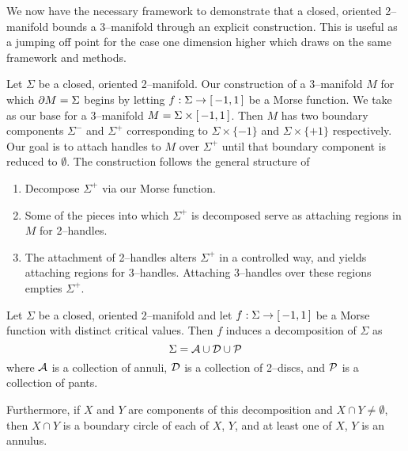\label{sec:2bound3}




We now have the necessary framework to demonstrate that a closed, oriented 2--manifold bounds a 3--manifold through an explicit construction.
This is useful as a jumping off point for the case one dimension higher which draws on the same framework and methods.

Let $\Sigma$ be a closed, oriented 2--manifold.
Our construction of a 3--manifold $M$ for which $\partial M=\Sigma$ begins by letting $f:\Sigma\to[\,-1,1\,]$ be a Morse function.
We take as our base for a 3--manifold $M=\Sigma\times[\,-1,1\,]$.
Then $M$ has two boundary components $\Sigma^-$ and $\Sigma^+$ corresponding to $\Sigma\times\{-1\}$ and $\Sigma\times\{+1\}$ respectively.
Our goal is to attach handles to $M$ over $\Sigma^+$ until that boundary component is reduced to $\emptyset$.
The construction follows the general structure of
\begin{enumerate}
	\item Decompose $\Sigma^+$ via our Morse function.
	\item Some of the pieces into which $\Sigma^+$ is decomposed serve as attaching regions in $M$ for 2--handles.
	\item The attachment of 2--handles alters $\Sigma^+$ in a controlled way, and yields attaching regions for 3--handles.  Attaching 3--handles over these regions empties $\Sigma^+$.
\end{enumerate}



%

\begin{lem}
	\label{lem:sigmadecomp}
	Let $\Sigma$ be a closed, oriented 2--manifold and let $f:\Sigma\to[\,-1,1\,]$ be a Morse function with distinct critical values.
	Then $f$ induces a decomposition of $\Sigma$ as
	\[
		\Sigma=\mathcal{A}\cup \mathcal{D}\cup \mathcal{P}
	\]
	where $\mathcal{A}$ is a collection of annuli, $\mathcal{D}$ is a collection of 2--discs, and $\mathcal{P}$ is a collection of pants.
	
	Furthermore, if $X$ and $Y$ are components of this decomposition and $X\cap Y\neq\emptyset$, then $X\cap Y$ is a boundary circle of each of $X$, $Y$, and at least one of $X$, $Y$ is an annulus.
\end{lem}

